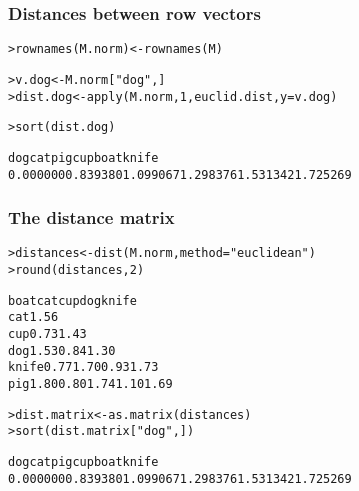 \begin{frame}[fragile]
  \frametitle{Distances between row vectors}

\ungap
\begin{alltt}\small
{}
> rownames(M.norm) <- rownames(M)

> v.dog <- M.norm["dog",]
> dist.dog <- apply(M.norm, 1, euclid.dist, y=v.dog)

> sort(dist.dog) \begin{Rout}
     dog      cat      pig      cup     boat    knife 
0.000000 0.839380 1.099067 1.298376 1.531342 1.725269 \end{Rout}
\end{alltt}
\end{frame}

\begin{frame}[fragile]
  \frametitle{The distance matrix}

\ungap
\begin{alltt}\small
{}
> distances <- dist(M.norm, method="euclidean")
> round(distances, 2) \begin{Rout}
      boat  cat  cup  dog knife
cat   1.56                     
cup   0.73 1.43                
dog   1.53 0.84 1.30           
knife 0.77 1.70 0.93 1.73      
pig   1.80 0.80 1.74 1.10  1.69 \end{Rout}

> dist.matrix <- as.matrix(distances)
> sort(dist.matrix["dog",]) \begin{Rout}
     dog      cat      pig      cup     boat    knife 
0.000000 0.839380 1.099067 1.298376 1.531342 1.725269 \end{Rout}
\end{alltt}
\end{frame}

